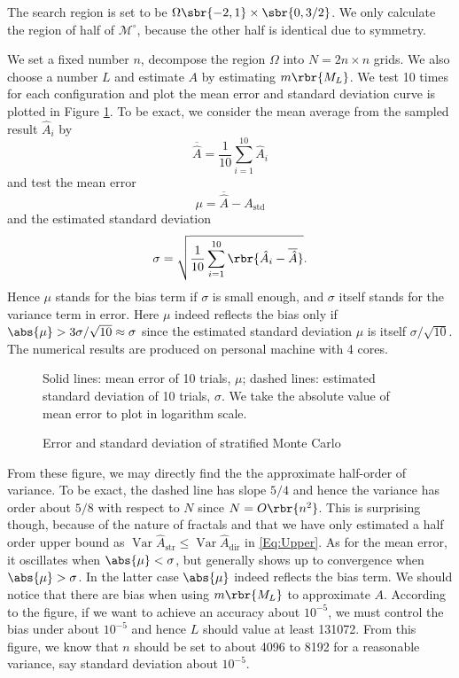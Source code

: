 \documentclass[english, nochinese]{pnote}
\DeclareMathOperator\opvar{\mathrm{Var}}
\begin{document}
The search region is set to be $ \Omega \sbr{ -2, 1 } \times \sbr{ 0, 3 / 2 } $. We only calculate the region of half of $\mathcal{M}^{\circ}$, because the other half is identical due to symmetry.

We set a fixed number $n$, decompose the region $\Omega$ into $ N = 2 n \times n $ grids. We also choose a number $L$ and estimate $A$ by estimating $ m \rbr{M_L} $. We test 10 times for each configuration and plot the mean error and standard deviation curve is plotted in Figure \ref{Fig:Err}. To be exact, we consider the mean average from the sampled result $\hat{A}_i$ by
\begin{equation}
\overline{\hat{A}} = \frac{1}{10} \sum_{ i = 1 }^{10} \hat{A}_i
\end{equation}
and test the mean error
\begin{equation}
\mu = \overline{\hat{A}} - A_{\text{std}}
\end{equation}
and the estimated standard deviation
\begin{equation}
\sigma = \sqrt{ \frac{1}{10} \sum_{ i = 1 }^{10} \rbr{ \hat{A}_i - \overline{\hat{A}} } }.
\end{equation}
Hence $\mu$ stands for the bias term if $\sigma$ is small enough, and $\sigma$ itself stands for the variance term in error. Here $\mu$ indeed reflects the bias only if $ \abs{\mu} > 3 \sigma / \sqrt{10} \approx \sigma $ since the estimated standard deviation $\mu$ is itself $ \sigma / \sqrt{10} $. The numerical results are produced on personal machine with 4 cores.

\begin{figure}[htbp]
{
\centering

\caption{Error and standard deviation of stratified Monte Carlo}
\label{Fig:Err}
}
{
\footnotesize Solid lines: mean error of 10 trials, $\mu$; dashed lines: estimated standard deviation of 10 trials, $\sigma$. We take the absolute value of mean error to plot in logarithm scale.
}
\end{figure}

From these figure, we may directly find the the approximate half-order of variance. To be exact, the dashed line has slope $ 5 / 4 $ and hence the variance has order about $ 5 / 8 $ with respect to $N$ since $ N = O \rbr{n^2} $. This is surprising though, because of the nature of fractals and that we have only estimated a half order upper bound as $ \opvar \hat{A}_{\text{str}} \le \opvar \hat{A}_{\text{dir}} $ in \eqref{Eq:Upper}. As for the mean error, it oscillates when $ \abs{\mu} < \sigma $, but generally shows up to convergence when $ \abs{\mu} > \sigma $. In the latter case $\abs{\mu}$ indeed reflects the bias term. We should notice that there are bias when using $ m \rbr{M_L} $ to approximate $A$. According to the figure, if we want to achieve an accuracy about $10^{-5}$, we must control the bias under about $10^{-5}$ and hence $L$ should value at least 131072. From this figure, we know that $n$ should be set to about 4096 to 8192 for a reasonable variance, say standard deviation about $10^{-5}$.
\end{document}
